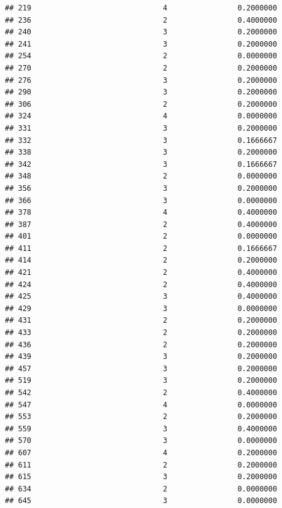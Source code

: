 \documentclass[
]{article}
\begin{document}
\begin{verbatim}
## 219                              4                0.2000000
## 236                              2                0.4000000
## 240                              3                0.2000000
## 241                              3                0.2000000
## 254                              2                0.0000000
## 270                              2                0.2000000
## 276                              3                0.2000000
## 290                              3                0.2000000
## 306                              2                0.2000000
## 324                              4                0.0000000
## 331                              3                0.2000000
## 332                              3                0.1666667
## 338                              3                0.2000000
## 342                              3                0.1666667
## 348                              2                0.0000000
## 356                              3                0.2000000
## 366                              3                0.0000000
## 378                              4                0.4000000
## 387                              2                0.4000000
## 401                              2                0.0000000
## 411                              2                0.1666667
## 414                              2                0.2000000
## 421                              2                0.4000000
## 424                              2                0.4000000
## 425                              3                0.4000000
## 429                              3                0.0000000
## 431                              2                0.2000000
## 433                              2                0.2000000
## 436                              2                0.2000000
## 439                              3                0.2000000
## 457                              3                0.2000000
## 519                              3                0.2000000
## 542                              2                0.4000000
## 547                              4                0.0000000
## 553                              2                0.2000000
## 559                              3                0.4000000
## 570                              3                0.0000000
## 607                              4                0.2000000
## 611                              2                0.2000000
## 615                              3                0.2000000
## 634                              2                0.0000000
## 645                              3                0.0000000

\end{verbatim}
\end{document}
